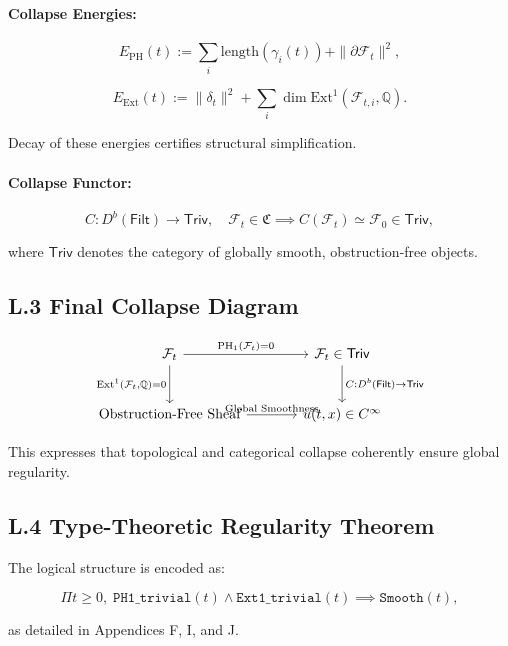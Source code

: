 \documentclass[11pt]{article}
\begin{document}
\paragraph{Collapse Energies:}

\[
E_{\mathrm{PH}}(t) := \sum_i \mathrm{length}(\gamma_i(t)) + \|\partial \mathcal{F}_t\|^2,
\]

\[
E_{\mathrm{Ext}}(t) := \|\delta_t\|^2 + \sum_i \dim \mathrm{Ext}^1(\mathcal{F}_{t,i}, \mathbb{Q}).
\]

Decay of these energies certifies structural simplification.

\paragraph{Collapse Functor:}

\[
C : D^b(\mathsf{Filt}) \to \mathsf{Triv},
\quad
\mathcal{F}_t \in \mathfrak{C} \implies C(\mathcal{F}_t) \simeq \mathcal{F}_0 \in \mathsf{Triv},
\]

where \( \mathsf{Triv} \) denotes the category of globally smooth, obstruction-free objects.

\subsection*{L.3 Final Collapse Diagram}

\[
\begin{tikzcd}[row sep=large, column sep=large]
\mathcal{F}_t
  \arrow[r, "{\mathrm{PH}_1(\mathcal{F}_t) = 0}"]
  \arrow[d, "{\mathrm{Ext}^1(\mathcal{F}_t, \mathbb{Q}) = 0}"']
& \mathcal{F}_t \in \mathsf{Triv}
  \arrow[d, "{C : D^b(\mathsf{Filt}) \to \mathsf{Triv}}"] \\
\text{Obstruction-Free Sheaf}
  \arrow[r, "{\text{Global Smoothness}}"]
& u(t, x) \in C^\infty
\end{tikzcd}
\]

This expresses that topological and categorical collapse coherently ensure global regularity.

\subsection*{L.4 Type-Theoretic Regularity Theorem}

The logical structure is encoded as:

\[
\Pi t \geq 0,\;
\texttt{PH1\_trivial}(t) \land \texttt{Ext1\_trivial}(t) \implies \texttt{Smooth}(t),
\]

as detailed in Appendices F, I, and J.
\end{document}
